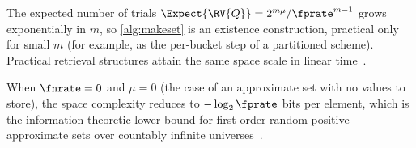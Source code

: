 \documentclass[ ../main.tex]{subfiles}
\begin{document}
\begin{remark}
The expected number of trials $\Expect{\RV{Q}} = 2^{m\mu}/\fprate^{m-1}$ grows exponentially in $m$, so \cref{alg:makeset} is an existence construction, practical only for small $m$ (for example, as the per-bucket step of a partitioned scheme).
Practical retrieval structures attain the same space scale in linear time~\cite{dietzfelbinger2008}.
\end{remark}

\begin{corollary}
When $\fnrate = 0$ and $\mu = 0$ (the case of an approximate set with no values to store), the space complexity reduces to $-\log_2 \fprate$ bits per element, which is the information-theoretic lower-bound for first-order random positive approximate sets over countably infinite universes~\cite{carter1978,cover2006}.
\end{corollary}
\end{document}
